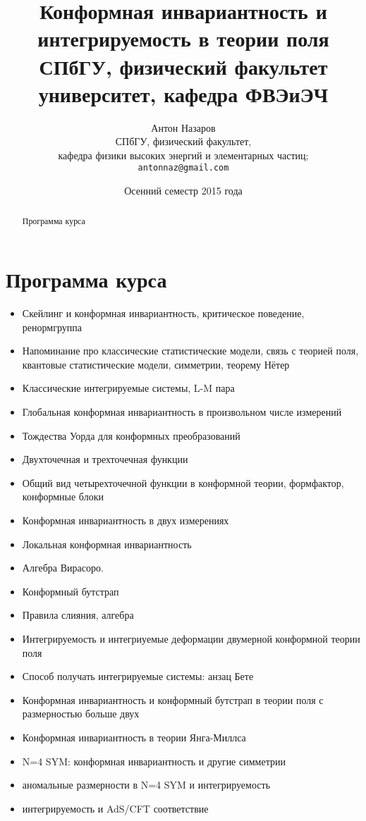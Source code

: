 \documentclass[a4paper,12pt]{article}
\title{Конформная инвариантность и интегрируемость в теории поля\\
  \small{СПбГУ, физический факультет университет, кафедра ФВЭиЭЧ}
}
\author{Антон Назаров\\
  \small{СПбГУ, физический факультет,}\\
  \small{ кафедра физики высоких энергий и элементарных частиц;}\\
  \texttt{antonnaz@gmail.com}
}
\date{Осенний семестр 2015 года}
\theoremstyle{definition}
\theoremstyle{definition}
\theoremstyle{definition}
\begin{document}
\maketitle
\thispagestyle{empty}
\begin{abstract}
  Программа курса
\end{abstract}
\tableofcontents

\section{Программа курса}
\label{sec:program}

  \begin{itemize}
  \item  Скейлинг и конформная инвариантность, критическое поведение, ренормгруппа
  \item Напоминание про классические статистические модели, связь с теорией поля, квантовые
    статистические модели, симметрии, теорему Нётер
  \item Классические интегрируемые системы, L-M пара
  \item Глобальная конформная инвариантность в произвольном числе измерений
  \item Тождества Уорда для конформных преобразований
  \item Двухточечная и трехточечная функции
  \item Общий вид четырехточечной функции в конформной теории, формфактор, конформные блоки
  \item Конформная инвариантность в двух измерениях
  \item Локальная конформная инвариантность
  \item Алгебра Вирасоро.
  \item Конформный бутстрап
  \item Правила слияния, алгебра
  \item Интегрируемость и интегриуемые деформации двумерной конформной теории поля
  \item Способ получать интегрируемые системы: анзац Бете
  \item Конформная инвариантность и конформный бутстрап в теории поля с размерностью больше двух
  \item Конформная инвариантность в теории Янга-Миллса
  \item N=4 SYM: конформная инвариантность и другие симметрии
  \item аномальные размерности в N=4 SYM и интегрируемость
  \item интегрируемость и AdS/CFT соответствие
  \end{itemize}
\end{document}
